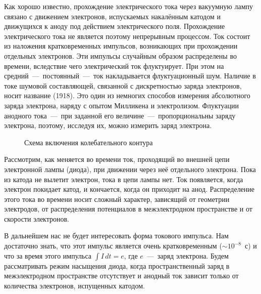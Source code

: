 


Как хорошо известно, прохождение электрического тока через вакуумную лампу
связано с движением электронов, испускаемых
накалённым катодом и движущихся к аноду под действием электрического поля.
Прохождение электрического тока не является
поэтому непрерывным процессом. Ток состоит из наложения кратковременных
импульсов, возникающих при прохождении отдельных
электронов. Эти импульсы случайным образом распределены во времени, вследствие
чего электрический ток флуктуирует. При
этом на средний~---~постоянный~---~ток накладывается флуктуационный шум. Наличие
в токе шумовой составляющей, связанной
с дискретностью заряда электронов, носит название 
(1918). Это один из немногих способов измерения
абсолютного заряда электрона, наряду с опытом Милликена и электролизом.
Флуктуации анодного тока~---~при заданной его
величине~---~пропорциональны заряду электрона, поэтому, исследуя их, можно
измерить заряд электрона.

\begin{figure}[h!]
	\caption{Схема включения колебательного контура}
\end{figure}

Рассмотрим, как меняется во времени ток, проходящий во внешней цепи электронной
лампы (диода), при движении через неё
отдельного электрона. Пока из катода не вылетит электрон, тока в цепи лампы нет.
Ток появляется, когда электрон покидает
катод, и кончается, когда он приходит на анод. Распределение этого тока во
времени носит сложный характер, зависящий от
геометрии электродов, от распределения потенциалов в межэлектродном пространстве
и от скорости электронов.

В дальнейшем нас не будет интересовать форма токового импульса. Нам достаточно
знать, что этот импульс является очень
кратковременным (${\sim}10^{-8}$~с) и что за время этого импульса $\int
I\,dt=e$, где $e$~---~заряд электрона. Будем
рассматривать режим насыщения диода, когда пространственный заряд в
межэлектродном пространстве отсутствует и анодный
ток зависит только от количества электронов, испущенных катодом.

